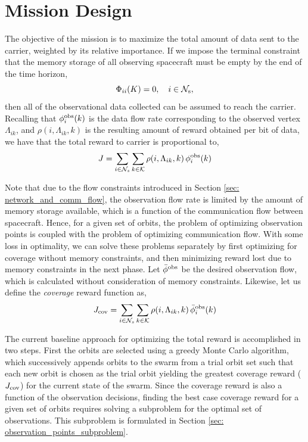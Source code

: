 \documentclass[letterpaper, 10 pt, conference]{ieeeconf}  %
\theoremstyle{definition}
\begin{document}
\section{Mission Design}

The objective of the mission is to maximize the total amount of data sent to the carrier, weighted by its relative importance. 
If we impose the terminal constraint that the memory storage of all observing spacecraft must be empty by the end of the time horizon,
\begin{equation} \label{eq: flow_terminal_constraint}
    \Phi_{ii}(K) = 0,\quad i\in\mathcal{N}_{\rm s},
\end{equation}
then all of the observational data collected can be assumed to reach the carrier. 
Recalling that $\phi^{\rm obs}_{i}(k)$ is the data flow rate corresponding to the observed vertex $\Lambda_{ik}$, and $\rho(i,\Lambda_{ik},k)$ is the resulting amount of reward obtained per bit of data, we have that the total reward to carrier is proportional to,
\begin{equation} \label{eq: total_reward}
    J = \sum_{i\in\mathcal{N}_s} \sum_{k\in\mathcal{K}} \rho(i,\Lambda_{ik},k) \, \phi^{\rm obs}_{i}(k)
\end{equation}

Note that due to the flow constraints introduced in Section \ref{sec: network_and_comm_flow}, the observation flow rate is limited by the amount of memory storage available, which is a function of the communication flow between spacecraft. 
Hence, for a given set of orbits, the problem of optimizing observation points is coupled with the problem of optimizing communication flow. 
With some loss in optimality, we can solve these problems separately by first optimizing for coverage without memory constraints, and then minimizing reward lost due to memory constraints in the next phase.
Let $\bar{\phi}^{\rm obs}$ be the desired observation flow, which is calculated without consideration of memory constraints. Likewise, let us define the \textit{coverage} reward function as, 
\begin{equation} \label{eq: coverage_reward}
    J_{\rm cov} = \sum_{i\in\mathcal{N}_s} \sum_{k\in\mathcal{K}} \rho(i,\Lambda_{ik},k) \, \bar{\phi}^{\rm obs}_{i}(k)
\end{equation}

The current baseline approach for optimizing the total reward is accomplished in two steps. First the orbits are selected using a greedy Monte Carlo algorithm, which successively appends orbits to the swarm from a trial orbit set such that each new orbit is chosen as the trial orbit yielding the greatest coverage reward ($J_{\rm cov}$) for the current state of the swarm. Since the coverage reward is also a function of the observation decisions, finding the best case coverage reward for a given set of orbits requires solving a subproblem for the optimal set of observations. This subproblem is formulated in Section \ref{sec: observation_points_subproblem}.
% 
\end{document}

